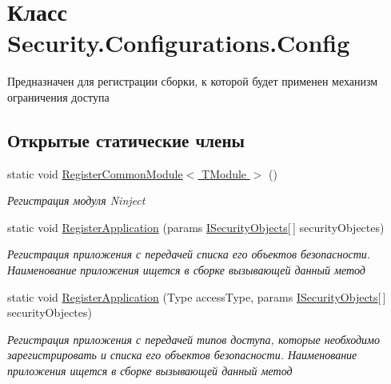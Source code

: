 \hypertarget{class_security_1_1_configurations_1_1_config}{}\section{Класс Security.\+Configurations.\+Config}
\label{class_security_1_1_configurations_1_1_config}


Предназначен для регистрации сборки, к которой будет применен механизм ограничения доступа  


\subsection*{Открытые статические члены}
\begin{DoxyCompactItemize}
\item 
static void \hyperlink{class_security_1_1_configurations_1_1_config_a014e79b3f4d0bf2fada22d715df9c849}{Register\+Common\+Module$<$ T\+Module $>$} ()
\begin{DoxyCompactList}\small\item\em Регистрация модуля Ninject \end{DoxyCompactList}\item 
static void \hyperlink{class_security_1_1_configurations_1_1_config_a4f0405cc257b3cd627c58d215aad3fdf}{Register\+Application} (params \hyperlink{interface_security_1_1_interfaces_1_1_i_security_objects}{I\+Security\+Objects}\mbox{[}$\,$\mbox{]} security\+Objectes)
\begin{DoxyCompactList}\small\item\em Регистрация приложения с передачей списка его объектов безопасности. Наименование приложения ищется в сборке вызывающей данный метод \end{DoxyCompactList}\item 
static void \hyperlink{class_security_1_1_configurations_1_1_config_a6e83390ad4628a39588e4987b7acb1b8}{Register\+Application} (Type access\+Type, params \hyperlink{interface_security_1_1_interfaces_1_1_i_security_objects}{I\+Security\+Objects}\mbox{[}$\,$\mbox{]} security\+Objectes)
\begin{DoxyCompactList}\small\item\em Регистрация приложения с передачей типов доступа, которые необходимо зарегистрировать и списка его объектов безопасности. Наименование приложения ищется в сборке вызывающей данный метод \end{DoxyCompactList}\item 

\end{DoxyCompactItemize}
